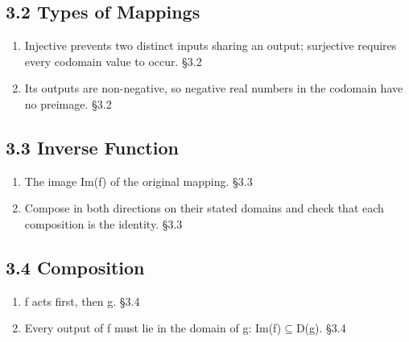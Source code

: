 \documentclass[11pt]{article}
\begin{document}
\begin{keepsection}\subsection{3.2 Types of Mappings}

\begin{enumerate}
\item Injective prevents two distinct inputs sharing an output; surjective requires every codomain value to occur. \hfill{\small\color{FAUblue}§3.2}
\item Its outputs are non-negative, so negative real numbers in the codomain have no preimage. \hfill{\small\color{FAUblue}§3.2}
\end{enumerate}

\end{keepsection}
\begin{keepsection}\subsection{3.3 Inverse Function}

\begin{enumerate}
\item The image Im(f) of the original mapping. \hfill{\small\color{FAUblue}§3.3}
\item Compose in both directions on their stated domains and check that each composition is the identity. \hfill{\small\color{FAUblue}§3.3}
\end{enumerate}

\end{keepsection}
\begin{keepsection}\subsection{3.4 Composition}

\begin{enumerate}
\item f acts first, then g. \hfill{\small\color{FAUblue}§3.4}
\item Every output of f must lie in the domain of g: Im(f)\ensuremath{\subseteq}D(g). \hfill{\small\color{FAUblue}§3.4}
\end{enumerate}

\end{keepsection}
\end{document}
